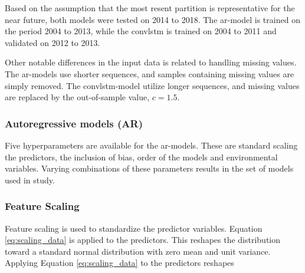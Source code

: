 Based on the assumption that the most resent partition is representative for the near future, both models were tested on 2014 to 2018. The \acrshort{ar}-model is trained on the period 2004 to 2013, while the \acrshort{convlstm} is trained on  2004 to 2011 and validated on 2012 to 2013.

Other notable differences in the input data is related to handling missing values.  
The \acrshort{ar}-models use shorter sequences, and samples containing missing values are simply removed. The \acrshort{convlstm}-model utilize longer sequences, and missing values are replaced by the out-of-sample value, $c=1.5$. 

\subsubsection{Autoregressive models (AR)}
Five hyperparameters are available for the \acrshort{ar}-models. These are standard scaling the predictors, the inclusion of bias, order of the models and environmental variables. Varying combinations of these parameters results in the set of models used in study. 

\subsubsection{Feature Scaling} \label{sec:scaling_predictors}
Feature scaling is used to standardize the predictor variables.
Equation \eqref{eq:scaling_data} is applied to the predictors. This 
reshapes the distribution toward a standard normal distribution with zero mean and unit variance. 
Applying Equation \eqref{eq:scaling_data} to the predictors reshapes %

